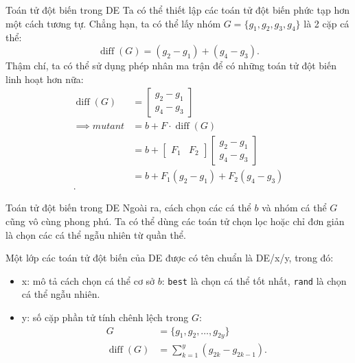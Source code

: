 \begin{frame}{Toán tử đột biến trong DE}
  Ta có thể thiết lập các toán tử đột biến phức tạp hơn một cách tương tự. Chẳng
  hạn, ta có thể lấy nhóm \( G = \{g_{1}, g_{2}, g_{3},
  g_{4}\}   \) là 2 cặp cá thể:
  \[
    \operatorname{diff}(G) = (g_{2} - g_{1}) + (g_{4} - g_{3})
  .\] 
  Thậm chí, ta có thể sử dụng phép nhân ma trận để có những toán tử đột biến
  linh hoạt hơn nữa:
  \begin{align*}
    \operatorname{diff}(G) &= \begin{bmatrix} g_{2} - g_{1} \\ g_{4} - g_{3}
    \end{bmatrix}\\
      \implies mutant &= b + F \cdot \operatorname{diff} (G) \\
                      &= b + \begin{bmatrix} F_{1} & F_{2} \end{bmatrix}
                      \begin{bmatrix} g_{2} - g_{1} \\ g_{4} - g_{3}
                      \end{bmatrix}  \\
                      &= b + F_{1}(g_{2} - g_{1}) + F_{2}(g_{4} - g_{3}) \\
  .\end{align*}
\end{frame}

\begin{frame}{Toán tử đột biến trong DE}
  Ngoài ra, cách chọn các cá thể \( b \) và nhóm cá thể \( G \) cũng vô cùng
  phong phú. Ta có thể dùng các toán tử chọn lọc hoặc chỉ đơn giản là chọn các
  cá thể ngẫu nhiên từ quần thể.

  Một lớp các toán tử đột biến của DE được có tên chuẩn là DE/x/y,
  trong đó:
\begin{itemize}
\item x: mô tả cách chọn cá thể cơ sở \( b \): \texttt{best} là chọn cá thể tốt
  nhất, \texttt{rand} là chọn cá thể ngẫu nhiên.
\item y: số cặp phần tử tính chênh lệch trong \( G \):
  \begin{align*}
    G &= \{g_{1}, g_{2}, \ldots , g_{2y}\}  \\
    \operatorname{diff}(G) &= \sum_{k = 1}^{y} (g_{2k} - g_{2k - 1})
  .\end{align*}
\end{itemize}
\end{frame}

